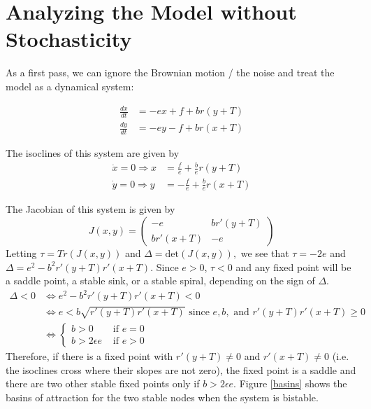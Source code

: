 \documentclass{article}
\begin{document}
\section{Analyzing the Model without Stochasticity }
As a first pass, we can ignore the Brownian motion / the noise and treat the model as a dynamical system:

\begin{align*}
\frac{dx}{dt}&=-ex+f+br(y+T)
\\ \frac{dy}{dt}&=-ey-f+br(x+T)
\end{align*}

The isoclines of this system are given by
\begin{align*}
\dot{x}=0 \Rightarrow x&=\frac{f}{e}+\frac{b}{e}r(y+T) 
\\\dot{y}=0 \Rightarrow y&=-\frac{f}{e}+\frac{b}{e}r(x+T)
\end{align*}

The Jacobian of this system is given by
$$J(x,y)=\left(\begin{array}{cccc} 
-e & br'(y+T)
\\ br'(x+T) & -e
\end{array}\right)$$
Letting $\tau=Tr(J(x,y))$ and $\Delta=\text{det}(J(x,y)),$ we see that $\tau=-2e$ and $\Delta=e^2-b^2r'(y+T)r'(x+T)$.  Since $e>0$, $\tau<0$ and any fixed point will be a saddle point, a stable sink, or a stable spiral, depending on the sign of $\Delta$.  
\begin{align*}
\Delta<0 &\Leftrightarrow e^2-b^2r'(y+T)r'(x+T)<0 
\\&\Leftrightarrow e<b\sqrt{r'(y+T)r'(x+T)} \text{ since } e,b, \text{ and } r'(y+T)r'(x+T)\geq0
\\ &\Leftrightarrow \left\{\begin{array}{cccc}
b>0 & \text{ if } e=0
\\ b>2\epsilon e & \text{ if } e>0
\end{array}\right.
\end{align*}
Therefore, if there is a fixed point with $r'(y+T)\neq 0$ and $r'(x+T)\neq 0$ (i.e. the isoclines cross where their slopes are not zero), the fixed point is a saddle and there are two other stable fixed points only if $b>2\epsilon e$.  Figure \ref{basins} shows the basins of attraction for the two stable nodes when the system is bistable.  
\end{document}
